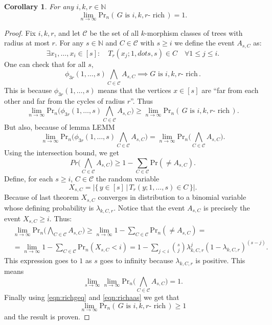 \documentclass[11pt,notitlepage,a4paper]{article}
\newtheorem{corollary}{Corollary}[section]
\theoremstyle{definition}
\newcommand{\N}{\mathbb{N}}
\newcommand{\Ln}{\lim\limits_{n\to \infty}}
\begin{document}
\begin{corollary} \label{thm:rich}
	For any $i,k,r\in \N$
	\[\Ln \mathrm{Pr}_n(\, G \text{ is } i,k,r\text{- rich}\,)=1.\]
\end{corollary}
\begin{proof}
	Fix $i,k,r$, and let $\mathcal{C}$ be the set of all
	$k$-morphism classes of trees with radius at most $r$.
	For any $s\in \N$ and $C\in \mathcal{C}$ with $s\geq i$ we define
	the event $A_{s,C}$ as:
	\[ \exists x_1, \dots, x_i \in [s]: \quad T_r(x_j;1,dots, s)\in C \quad
	\forall 1\leq j \leq i.\] 
	One can check that for all $s$, 
	\[ \phi_{3r}(1,\dots, s) \bigwedge_{C\in \mathcal{C}} A_{s,C}
	\implies  G \text{ is } i,k,r\text{- rich}\, .\]
	This is because  $\phi_{3r}(1,\dots, s)$ means that the
	vertices $x\in [s]$ are ``far from each other and far from 
	the cycles of radius $r$''. Thus
	\begin{equation}\label{eqn:richgeq}
	\Ln \mathrm{Pr}_n\Bigg(\phi_{3r}(1,\dots, s) 
	\bigwedge_{C\in \mathcal{C}} A_{s,C}\Bigg)
	\geq \Ln \mathrm{Pr}_n(\, G \text{ is } i,k,r\text{- rich}\,).
	\end{equation}
	But also, because of lemma LEMM
	\begin{equation} \label{eqn:richaas}
	\Ln \mathrm{Pr}_n\Bigg(\phi_{3r}(1,\dots, s) 
	\bigwedge_{C\in \mathcal{C}} A_{s,C}\Bigg)=
	\Ln \mathrm{Pr}_n\Bigg( 
	\bigwedge_{C\in \mathcal{C}} A_{s,C}\Bigg).
	\end{equation}
	Using the intersection bound, we get
	\[ Pr\Bigg( 
	\bigwedge_{C\in \mathcal{C}} A_{s,C}\Bigg)\geq
	1- \sum_{C\in\mathcal{C}} \mathrm{Pr}(\neq A_{s,C}).\]
	Define, for each $s\geq i$, $C\in \mathcal{C}$ the
	random variable
	\[ X_{s,C}=|\{ \, y\in [s] \, | \, T_r(y; 1,\dots, s)\in C \,   \}|.\]
	Because of last theorem $X_{s,C}$ converges in distribution
	to a binomial variable whose defining probability is $\lambda_{k,C,r}$. 
	Notice that the event $A_{s,C}$ is precisely the event
	$X_{s,C}\geq i$. Thus:
	\begin{align*}
	 &\Ln \mathrm{Pr}_n\Bigg( 
	\bigwedge_{C\in \mathcal{C}} A_{s,C}\Bigg)\geq
	\Ln 1- \sum_{C\in\mathcal{C}} \mathrm{Pr}_n(\neq A_{s,C})=\\
	&=\Ln 1- \sum_{C\in\mathcal{C}} \mathrm{Pr}_n(X_{s,C}<i)=
	1- \sum_{j<i} \binom{s}{j}\lambda_{k,C,r}^j(1-\lambda_{k,C,r})^{(s-j)}.
	\end{align*}
	This expression goes to $1$ as $s$ goes to infinity because
	$\lambda_{k,C,r}$ is positive. This means 
	\[ \lim\limits_{s\to \infty} \Ln \mathrm{Pr}_n\Bigg( 
	\bigwedge_{C\in \mathcal{C}} A_{s,C}\Bigg)=1. \]
	Finally using \cref{eqn:richgeq} and \cref{eqn:richaas} 
	we get that 
	\[\Ln \mathrm{Pr}_n(\, G \text{ is } i,k,r\text{- rich}\,)\geq 1\]
	and the result is proven.
\end{proof}
\end{document}
